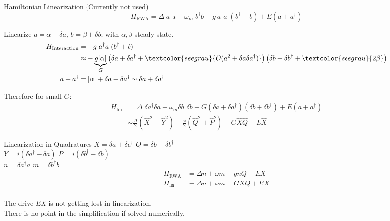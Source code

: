 \begin{frame}{Hamiltonian Linearization (Currently not used)}
	\textcolor{seegrau}{
		$$
			H_\text{RWA} = \Delta\; a^\dagger a + \omega_m\; b^\dagger b - g\; a^\dagger a\; (b^\dagger + b) 
			+ E (a+ a^\dagger)
		$$
	}	

	Linearize $a = \alpha + \delta a$, $b = \beta + \delta b$; with $\alpha, \beta$ steady state.\\
	\begin{align*}
		H_\text{Interaction} &= 
		- g\; a^\dagger a\; (b^\dagger + b)\\
		&\approx -\underbrace{g |\alpha|}_{G} 
		\left(\delta a + \delta a^\dagger + \textcolor{seegrau}{\mathcal{O}(a^2 + \delta a \delta a^\dagger) }\right)
		\left(\delta b + \delta b^\dagger + \textcolor{seegrau}{2 \beta}\right)\\
		a + a^\dagger
		&= |\alpha| + \delta a + \delta a^\dagger
		\sim \delta a + \delta a^\dagger
	\end{align*}

	Therefore for small $G$:
	\begin{align*}
		H_\text{lin} &= \Delta\; \delta a^\dagger \delta a 
		+ \omega_m \delta b^\dagger \delta b
		- G (\delta a + \delta a^\dagger)(\delta b + \delta b^\dagger)
		+ E(a+a^\dagger)
		\\
		&\sim \frac{\Delta}{2} (\hat X^2 + \hat Y^2) + \frac{\omega}{2} (\hat Q^2 + \hat P^2) - G \hat X \hat Q 
		+ E \hat X
	\end{align*}

\end{frame}

\begin{frame}{Linearization in Quadratures}
	$X = \delta a + \delta a^\dagger$\quad
	$Q = \delta b + \delta b^\dagger$\\
	$Y = i(\delta a^\dagger - \delta a)$\quad
	$P = i(\delta b^\dagger - \delta b)$\\
	$n = \delta a^\dagger a$\quad
	$m = \delta b^\dagger b$
	\begin{align*}
		H_\text{RWA} &= \Delta n + \omega m - g n Q + E X\\
		H_\text{lin} &= \Delta n + \omega m - G X Q + E X\\
	\end{align*}

	\small
	The drive $EX$ is not getting lost in linearization.\\
	There is no point in the simplification if solved numerically.
\end{frame}

